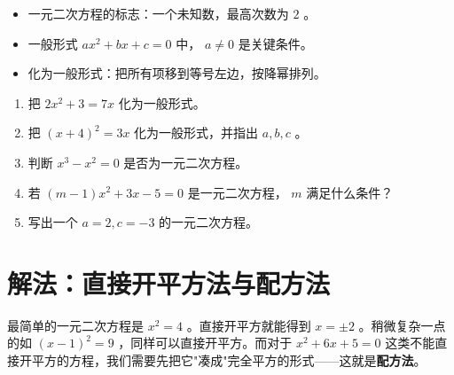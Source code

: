 \begin{keytakeaway}


\begin{itemize}
  \item 一元二次方程的标志：一个未知数，最高次数为 $2$ 。
  \item 一般形式 $ax^2 + bx + c = 0$ 中， $a \neq 0$ 是关键条件。
  \item 化为一般形式：把所有项移到等号左边，按降幂排列。
\end{itemize}


\end{keytakeaway}

\begin{practice}


\begin{enumerate}
  \item 把 $2x^2 + 3 = 7x$ 化为一般形式。
  \item 把 $(x + 4)^2 = 3x$ 化为一般形式，并指出 $a, b, c$ 。
  \item 判断 $x^3 - x^2 = 0$ 是否为一元二次方程。
  \item 若 $(m-1)x^2 + 3x - 5 = 0$ 是一元二次方程， $m$ 满足什么条件？
  \item 写出一个 $a = 2, c = -3$ 的一元二次方程。
\end{enumerate}


\end{practice}

\section*{解法：直接开平方法与配方法}


\begin{explore}


最简单的一元二次方程是 $x^2 = 4$ 。直接开平方就能得到 $x = \pm 2$ 。稍微复杂一点的如 $(x - 1)^2 = 9$ ，同样可以直接开平方。而对于 $x^2 + 6x + 5 = 0$ 这类不能直接开平方的方程，我们需要先把它"凑成"完全平方的形式——这就是\textbf{配方法}。

\end{explore}

